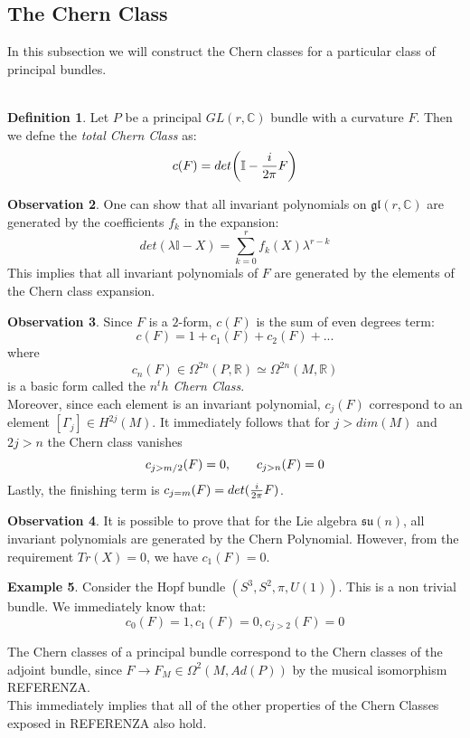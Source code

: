 \documentclass[12pt,a4paper]{report}
\theoremstyle{definition}
\newtheorem{Def}{Definition}[chapter]
\theoremstyle{Theorem}
\theoremstyle{definition}
\newtheorem{Ex}[Def]{Example}
\theoremstyle{definition}
\newtheorem{Obs}[Def]{Observation}
\begin{document}
		\subsection{The Chern Class}
			In this subsection we will construct the Chern classes for a particular class of principal bundles.\\
			\\
			\begin{Def}
				Let $P$ be a principal $GL(r,\mathbb{C})$ bundle with a curvature $F$. Then we defne the \textit{total Chern Class} as:
				$$c(F)=det\bigg(\mathbb{I}-{i\over 2\pi}F\bigg)$$ 
			\end{Def}
			\begin{Obs}
				One can show that all invariant polynomials on $\mathfrak{gl}(r,\mathbb{C})$ are generated by the coefficients $f_k$ in the expansion:
				$$det(\lambda\mathbb{I}-X)=\sum_{k=0}^r f_k(X)\lambda^{r-k}$$
				This implies that all invariant polynomials of $F$ are generated by the elements of the Chern class expansion.
			\end{Obs}
			\begin{Obs}
				Since $F$ is a $2$-form, $c(F)$ is the sum of even degrees term:
				$$c(F)=1+c_1(F)+c_2(F)+...$$
				where $$c_n(F)\in\Omega^{2n}(P,\mathbb{R})\simeq\Omega^{2n}(M,\mathbb{R})$$
				is a basic form called the \textit{$n^th$ Chern Class}.\\
				Moreover, since each element is an invariant polynomial, $c_j(F)$ correspond to an element $[\Gamma_j]\in H^{2j}(M)$. It immediately follows that for $j>dim(M)$ and $2j>n$ the Chern class vanishes 
				$$c_{j>m/2}(F)=0,\hspace{20 pt}c_{j>n}(F)=0$$
				Lastly, the finishing term is $c_{j=m}(F)=det({i\over 2\pi}F)$.
			\end{Obs}
			\begin{Obs}
				It is possible to prove that for the Lie algebra $\mathfrak{su}(n)$, all invariant polynomials are generated by the Chern Polynomial. However, from the requirement $Tr(X)=0$, we have $c_1(F)=0$.
			\end{Obs}
			\begin{Ex}
				Consider the Hopf bundle $(S^3,S^2,\pi,U(1))$. This is a non trivial bundle. We immediately know that:
				$$c_0(F)=1,c_1(F)=0,c_{j>2}(F)=0$$
			\end{Ex}
			The Chern classes of a principal bundle correspond to the Chern classes of the adjoint bundle, since $F\rightarrow F_M\in\Omega^2(M,Ad(P))$ by the musical isomorphism REFERENZA.\\
			This immediately implies that all of the other properties of the Chern Classes exposed in REFERENZA also hold.
\end{document}

